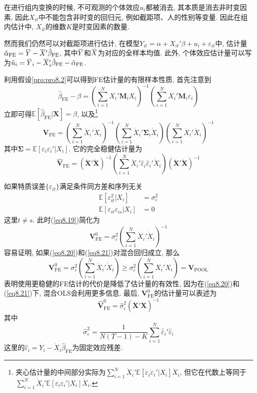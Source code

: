 \documentclass[cn, 12pt, math=mtpro2, bibstyle=apa, blue, twocol]{elegantbook}
\newcommand{\E}{\mathbb{E}}
\newcommand{\X}{\mathbold{X}}
\newcommand{\hb}{\hat{\beta}}
\newcommand{\V}{\mathbold{V}}
\newcommand{\overbar}[1]{\mkern 1.5mu\overline{\mkern-1.5mu#1\mkern-1.5mu}\mkern 1.5mu}
\begin{document}
\begin{remark}
在进行组内变换的时候, 不可观测的个体效应$u_i$都被消去, 其本质是消去非时变因素, 因此$X_{it}$中不能包含非时变的回归元, 例如截距项、人的性别等变量. 因此在组内估计中, $X_{it}$的维数$K$是时变因素的数量.

然而我们仍然可以对截距项进行估计, 在模型$Y_{it}=\alpha+X_{it}'\beta+u_i+\varepsilon_{it}$中, 估计量$\hat{\alpha}_{\text{FE}}=\overbar{Y}-\overbar{X}'\hb_{\text{FE}}$, 其中$\overbar{Y}$和$\overbar{X}$为对应的全样本均值. 此外, 个体效应估计量可以写为$\hat{u}_i=\overbar{Y}_i-\overbar{X}_i'\hb_{\text{FE}}-\hat{\alpha}_{\text{FE}}$.
\end{remark}

利用假设\ref{pro:pro8.2}可以得到FE估计量的有限样本性质, 首先注意到
$$\hb_{\text{FE}}-\beta=\left(\sum_{i=1}^{N}X_i'\mathbold{M}_iX_i\right)^{-1}\left(\sum_{i=1}^{N}X_i'\mathbold{M}_i\varepsilon_i\right)$$
立即可得$\E[\hb_{\text{FE}}|\X]=\beta$, 以及\footnote{夹心估计量的中间部分实际为$\sum_{i=1}^{N}\dot{X}_i'\E[\dot{\varepsilon}_i\dot{\varepsilon}_i'|X_i]\dot{X}_i$, 但它在代数上等同于$\sum_{i=1}^{N}\dot{X}_i'\E[\varepsilon_i\varepsilon_i'|X_i]\dot{X}_i$.}
\begin{equation}\label{eq8.19}
  \V_{\text{FE}}=\left(\sum_{i=1}^{N}\dot{X}_i'\dot{X}_i\right)^{-1}\left(\sum_{i=1}^{N}\dot{X}_i'\mathbold{\Sigma}_i\dot{X}_i\right)\left(\sum_{i=1}^{N}\dot{X}_i'\dot{X}_i\right)^{-1}
\end{equation}
其中$\mathbold{\Sigma}=\E[\varepsilon_i\varepsilon_i'|X_i]$. 它的完全稳健估计量为
\begin{equation}\label{eq8.34}
  \hat{\V}_{\text{FE}}=(\dot{\X}'\dot{\X})^{-1}\left(\sum_{i=1}^{N}\dot{X}_i'\hat{\varepsilon}_i\hat{\varepsilon}_i'\dot{X}_i\right)\left(\dot{\X}'\dot{\X}\right)^{-1}
\end{equation}

如果特质误差$\{\varepsilon_{it}\}$满足条件同方差和序列无关
\begin{align}
\E[\varepsilon_{it}^2|X_i]&=\sigma_\varepsilon^2 \label{eq8.20} \\
\E[\varepsilon_{it}\varepsilon_{is}|X_i]&=0 \label{eq8.21}
\end{align}
这里$t\neq s$. 此时(\ref{eq8.19})简化为
$$\V_{\text{FE}}^0=\sigma_\varepsilon^2\left(\sum_{i=1}^{N}\dot{X}_i'\dot{X}_i\right)^{-1}$$
容易证明, 如果(\ref{eq8.20})和(\ref{eq8.21})对混合回归成立, 那么
$$\V_{\text{FE}}^0=\sigma_\varepsilon^2\left(\sum_{i=1}^{N}\dot{X}_i'\dot{X}_i\right)\geq \sigma_\varepsilon^2\left(\sum_{i=1}^{N}X_i'X_i\right)=\V_{\text{POOL}}$$
表明使用更稳健的FE估计的代价是降低了估计量的有效性, 因为在(\ref{eq8.20})和(\ref{eq8.21})下, 混合OLS会利用更多信息. 最后, $\V_{\text{FE}}^0$的估计量可以表述为
\begin{equation}\label{eq8.35}
  \hat{\V}_{\text{FE}}^0=\hat{\sigma}_\varepsilon^2(\dot{\X}'\dot{\X})^{-1}
\end{equation}
其中
\begin{equation}\label{eq8.24}
  \hat{\sigma}_\varepsilon^2=\frac{1}{N(T-1)-K}\sum_{i=1}^{N}\hat{\varepsilon}_i'\hat{\varepsilon}_i
\end{equation}
这里的$\hat{\varepsilon}_i=\dot{Y}_i-\dot{X}_i\hb_{\text{FE}}$为固定效应残差.
\end{document}
